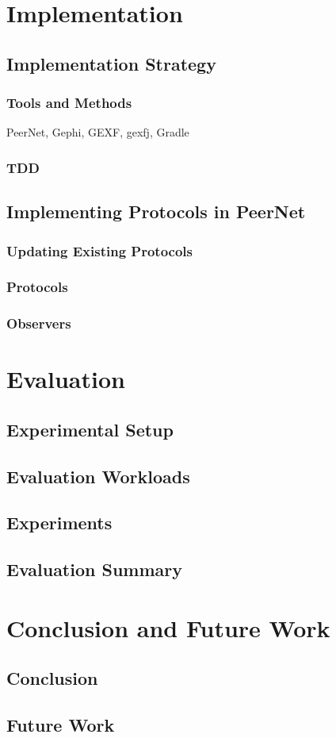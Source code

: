 \documentclass[UKenglish, a4paper]{ifimaster}
\begin{document}
\chapter{Implementation}
\label{ch:implementation}
    \section{Implementation Strategy}
        \subsection{Tools and Methods}
        PeerNet, Gephi, GEXF, gexfj, Gradle
        \subsection{TDD}
    \section{Implementing Protocols in PeerNet}
        \subsection{Updating Existing Protocols}
        \subsection{Protocols}
        \subsection{Observers}

\chapter{Evaluation}
\label{ch:evaluation}
    \section{Experimental Setup}
    \section{Evaluation Workloads}
    \section{Experiments}
    \section{Evaluation Summary}

\chapter{Conclusion and Future Work}
\label{ch:conclusion-and-future-work}
    \section{Conclusion}
    \section{Future Work}


\backmatter{}
\printbibliography{}
\end{document}
